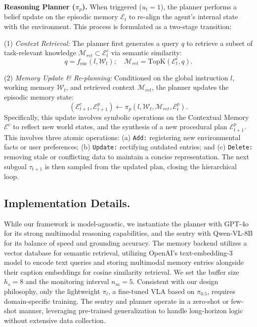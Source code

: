 \textbf{Reasoning Planner ($\pi_p$).}
When triggered ($u_t=1$), the planner performs a belief update on the episodic memory $\mathcal{E}_t$ to re-align the agent's internal state with the environment. This process is formulated as a two-stage transition:

(1) \textit{Context Retrieval:} The planner first generates a query $q$ to retrieve a subset of task-relevant knowledge $\mathcal{M}_{ret} \subset \mathcal{E}_t^c$ via semantic similarity:
\begin{equation}
    q = f_{\text{enc}}(l, \mathcal{W}_t); \quad \mathcal{M}_{ret} = \text{TopK}(\mathcal{E}_t^c, q).
\end{equation}

(2) \textit{Memory Update \& Re-planning:} Conditioned on the global instruction $l$, working memory $\mathcal{W}_t$, and retrieved context $\mathcal{M}_{ret}$, the planner updates the episodic memory state:
\begin{equation}
    (\mathcal{E}_{t+1}^c, \mathcal{E}_{t+1}^p) \leftarrow \pi_p(l, \mathcal{W}_t, \mathcal{M}_{ret}, \mathcal{E}_t^p).
\end{equation}
Specifically, this update involves symbolic operations on the Contextual Memory $\mathcal{E}^c$ to reflect new world states, and the synthesis of a new procedural plan $\mathcal{E}_{t+1}^p$. 
This involves three atomic operations: (a) \texttt{Add:} registering new environmental facts or user preferences; (b) \texttt{Update:} rectifying outdated entries; and (c) \texttt{Delete:} removing stale or conflicting data to maintain a concise representation. 
The next subgoal $\tau_{t+1}$ is then sampled from the updated plan, closing the hierarchical loop.


\subsection{Implementation Details.} 
While our framework is model-agnostic, we instantiate the planner with GPT-4o for its strong multimodal reasoning capabilities, and the sentry with Qwen-VL-8B for its balance of speed and grounding accuracy. The memory backend utilizes a vector database for semantic retrieval, utilizing OpenAI's text-embedding-3 model to encode text queries and storing multimodal memory entries alongside their caption embeddings for cosine similarity retrieval. We set the buffer size $h_s = 8$ and the monitoring interval $n_m = 5$. Consistent with our design philosophy, only the lightweight $\pi_l$, a fine-tuned VLA based on $\pi_{0.5}$, requires domain-specific training. The sentry and planner operate in a zero-shot or few-shot manner, leveraging pre-trained generalization to handle long-horizon logic without extensive data collection.
